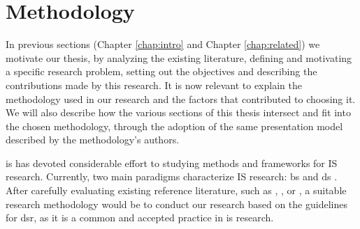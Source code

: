 \chapter{Methodology}
\label{chap:methods}

In previous sections (Chapter \ref{chap:intro} and Chapter \ref{chap:related}) we motivate our thesis, by analyzing the existing literature, defining and motivating a specific research problem, setting out the objectives and describing the contributions made by this research. It is now relevant to explain the methodology used in our research and the factors that contributed to choosing it. We will also describe how the various sections of this thesis intersect and fit into the chosen methodology, through the adoption of the same presentation model described by the methodology's authors.

\gls{is} has devoted considerable effort to studying methods and frameworks for IS research. Currently, two main paradigms characterize IS research: \gls{bs} and \gls{ds} \cite[76]{hevner_design_2004}. After carefully evaluating existing reference literature, such as \cite{hevner_design_2004}, \cite{march_design_1995}, \cite{winter_design_2008} or \cite{peffers_design_2007}, a suitable research methodology would be to conduct our research based on the guidelines for \gls{dsr}, as it is a common and accepted practice in \gls{is} research.

